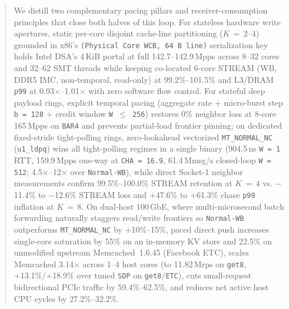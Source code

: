\begin{abstract}
We distill two complementary pacing pillars and receiver-consumption principles that close both halves of this loop. For stateless hardware write apertures, static per-core disjoint cache-line partitioning ($K\,=\,2$--$4$) grounded in x86's \texttt{(Physical Core WCB, 64\,B line)} serialization key holds Intel DSA's 4\,KiB portal at full 142.7--142.9\,Mpps across 8--32 cores and 32--62 SMT threads while keeping co-located 6-core STREAM (WB, DDR5 IMC, non-temporal, read-only) at 99.2\%--101.5\% and L3/DRAM \texttt{p99} at 0.93$\times$--1.01$\times$ with zero software flow control. For stateful deep payload rings, explicit temporal pacing (aggregate rate + micro-burst step \texttt{b\,=\,128} + credit window \texttt{W\,$\le$\,256}) restores 0\% neighbor loss at 8-core 165\,Mpps on \texttt{BAR4} and prevents partial-load frontier pinning; on dedicated fixed-stride tight-polling rings, zero-lookahead vectorized \texttt{MT\_NORMAL\_NC} (\texttt{u1\_ldpq}) wins all tight-polling regimes in a single binary (904.5\,ns \texttt{W\,=\,1} RTT, 159.9\,Mpps one-way at \texttt{CHA\,=\,16.9}, 61.4\,Mmsg/s closed-loop \texttt{W\,=\,512}; 4.5$\times$--12$\times$ over \texttt{Normal-WB}), while direct Socket-1 neighbor measurements confirm 99.5\%--100.0\% STREAM retention at $K\,=\,4$ vs. $-$11.4\% to $-$12.6\% STREAM loss and +47.6\% to +61.3\% chase \texttt{p99} inflation at $K\,=\,8$. On dual-host 100\,GbE, where multi-microsecond batch forwarding naturally staggers read/write frontiers so \texttt{Normal-WB} outperforms \texttt{MT\_NORMAL\_NC} by +10\%--15\%, paced direct push increases single-core saturation by 55\% on an in-memory KV store and 22.5\% on unmodified upstream Memcached~1.6.45 (Facebook ETC), scales Memcached 3.14$\times$ across 1--4 host cores (to 11.82\,Mrps on \texttt{get8}, +13.1\%/+18.9\% over tuned \texttt{SDP} on \texttt{get8}/\texttt{ETC}), cuts small-request bidirectional PCIe traffic by 59.4\%--62.5\%, and reduces net active host CPU cycles by 27.2\%--32.2\%.
\end{abstract}
